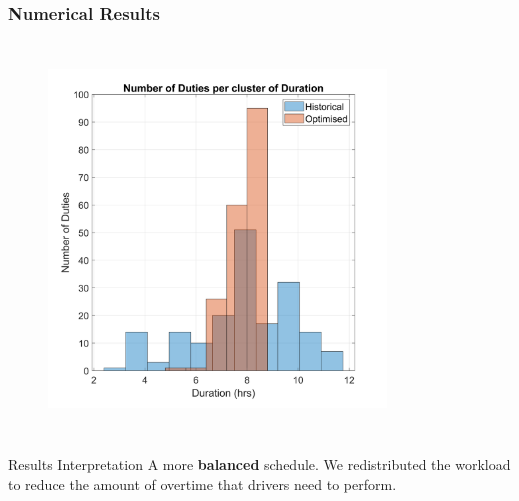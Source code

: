 \documentclass[handout]{beamer}
\begin{document}
\begin{frame}
\label{slide: makespan Scheduling}
	\frametitle{Numerical Results}


	\begin{columns}[]
			\centering
	   	\begin{figure}%
        \centering
        \includegraphics[width=0.8\textwidth]{Images/1-D1M1.png}
        \label{fig:1-D1M1}%
    \end{figure} 
	\end{columns}

        
        \begin{block}{Results Interpretation}
		A more \textbf{balanced} schedule. We redistributed the workload to reduce the amount of overtime that drivers need to perform.
	\end{block}

    
\end{frame}
\end{document}
